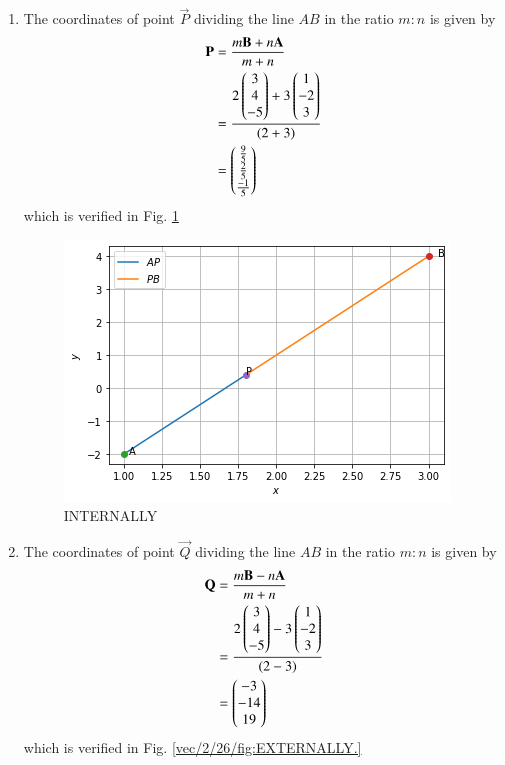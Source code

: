 \begin{enumerate}

\item  The coordinates of point $\vec{P}$ dividing the line $AB$ in the ratio $m:n$ is given by 
\begin{align}
\mathbf{P} &= \frac{m\mathbf{B}+n\mathbf{A}}{m+n}  \label{vec/2/26/2.0.2}
\\
&=\frac{2\begin{pmatrix}3\\4\\-5\end{pmatrix}+3\begin{pmatrix}1\\-2\\3\end{pmatrix}}
{(2+3)}
\\
&=\begin{pmatrix}{\frac{9}{5}} \\ {\frac{2}{5}} \\ {\frac{-1}{5}}\end{pmatrix}
\end{align}
which is verified in Fig.     \ref{vec/2/26/fig:Internally.}
\begin{figure}[!ht]
    \centering
\includegraphics[width=\columnwidth]{solutions/su2021/2/26/internally.png}
    \caption{INTERNALLY}
    \label{vec/2/26/fig:Internally.}
\end{figure} 

\item  The coordinates of point $\vec{Q}$ dividing the line $AB$ in the ratio $m:n$ is given by 
\begin{align}
 \mathbf{Q} &= \frac{m\mathbf{B}-n\mathbf{A}}{m+n}  \label{vec/2/26/2.0.5}
 \\
&=\frac{2\begin{pmatrix}3\\4\\-5\end{pmatrix}-3\begin{pmatrix}1\\-2\\3\end{pmatrix}}
{(2-3)}
\\
&=\begin{pmatrix}-3\\-14\\19\end{pmatrix}
\end{align}
%
which is verified in Fig.     \ref{vec/2/26/fig:EXTERNALLY.}



\end{enumerate}
